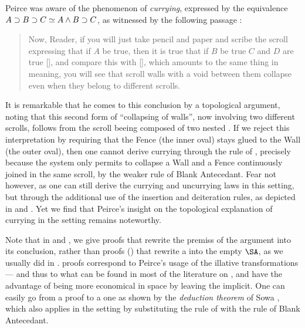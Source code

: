Peirce was aware of the phenomenon of \emph{currying}, expressed  by
the equivalence $A \supset B \supset C \simeq A \land B \supset C$, as witnessed by
the following passage \cite[p.~535]{peirce_prolegomena_1906}:
\begin{quote}
Now, Reader, if you will just take pencil and paper and scribe the scroll
expressing that if $A$ be true, then it is true that if $B$ be true $C$ and $D$
are true [], and compare this with [],
which amounts to the same thing in meaning, you will see that scroll walls with
a void between them collapse even when they belong to different scrolls.
\end{quote}
It is remarkable that he comes to this conclusion by a topological argument,
noting that this second form of ``collapsing of walls'', now involving two
different scrolls, follows from the scroll beeing composed of two nested
. If we reject this interpretation by requiring that the Fence (the
inner oval) stays glued to the Wall (the outer oval), then one cannot derive
currying through the rule of , precisely because the system
only permits to collapse a Wall and a Fence continuously joined in the same
scroll, by the weaker rule of Blank Antecedant. Fear not however, as one can
still derive the currying and uncurrying laws in this  setting,
but through the additional use of the insertion and deiteration rules, as
depicted in  and . Yet we find that
Peirce's insight on the topological explanation of currying in the 
setting remains noteworthy.

\begin{remark}
Note that in  and , we give
\emph{} proofs that rewrite the premiss of the argument into its
conclusion, rather than \emph{} proofs () that rewrite
a  into the empty $\SA$, as we usually did in .  proofs
correspond to Peirce's usage of the illative transformations --- and thus to
what can be found in most of the literature on , and have the advantage
of being more economical in space by leaving the  implicit. One can easily
go from a  proof to a  one as shown by the \emph{deduction
theorem} of Sowa \cite[Section 6]{sowa_peirces_2011}, which also applies in the
 setting by substituting the rule of  with the rule
of Blank Antecedant.
\end{remark}

